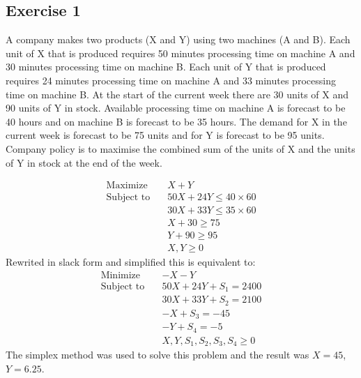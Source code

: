 \subsection{Exercise 1}
A company makes two products (X and Y) using two machines (A and B). Each unit of X that is produced requires 50 minutes processing time on machine A and 30 minutes processing time on machine B. Each unit of Y that is produced requires 24 minutes processing time on machine A and 33 minutes processing time on machine B.
At the start of the current week there are 30 units of X and 90 units of Y in stock. Available processing time on machine A is forecast to be 40 hours and on machine B is forecast to be 35 hours.
The demand for X in the current week is forecast to be 75 units and for Y is forecast to be 95 units. Company policy is to maximise the combined sum of the units of X and the units of Y in stock at the end of the week.

\begin{equation}
    \begin{aligned}
        \text{Maximize} \quad   & X + Y                       \\
        \text{Subject to} \quad & 50X + 24Y \leq 40 \times 60 \\
                                & 30X + 33Y \leq 35 \times 60 \\
                                & X + 30 \ge 75               \\
                                & Y + 90 \ge 95               \\
                                & X, Y \geq 0
    \end{aligned}
\end{equation}
Rewrited in slack form and simplified this is equivalent to:
\begin{equation}
    \begin{aligned}
        \text{Minimize} \quad   & -X - Y                          \\
        \text{Subject to} \quad & 50X + 24Y + S_1 = 2400          \\
                                & 30X + 33Y + S_2 = 2100          \\
                                & -X + S_3 = -45                  \\
                                & -Y + S_4 = -5                   \\
                                & X, Y, S_1, S_2, S_3, S_4 \geq 0
    \end{aligned}
\end{equation}
The simplex method was used to solve this problem and the result was $X = 45$, $Y = 6.25$.

